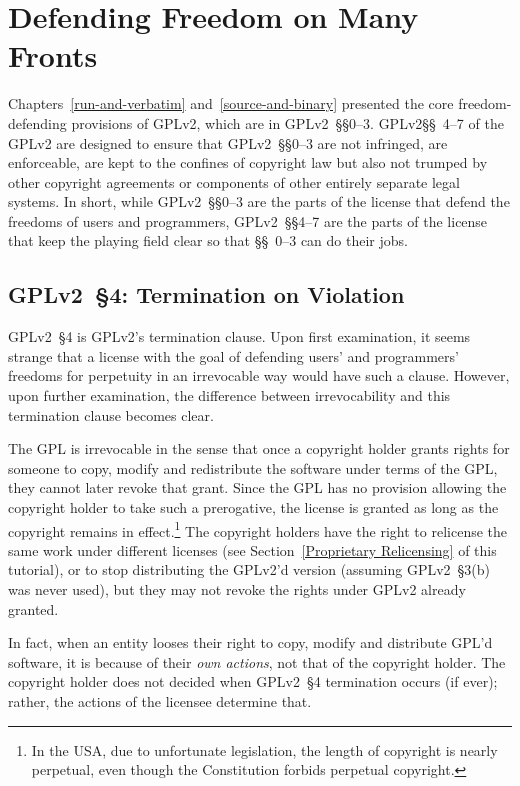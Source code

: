 \chapter{Defending Freedom on Many Fronts}

Chapters~\ref{run-and-verbatim} and~\ref{source-and-binary} presented the
core freedom-defending provisions of GPLv2\@, which are in GPLv2~\S\S0--3.
GPLv2\S\S~4--7 of the GPLv2 are designed to ensure that GPLv2~\S\S0--3 are
not infringed, are enforceable, are kept to the confines of copyright law but
also  not trumped by other copyright agreements or components of other
entirely separate legal systems.  In short, while GPLv2~\S\S0--3 are the parts
of the license that defend the freedoms of users and programmers,
GPLv2~\S\S4--7 are the parts of the license that keep the playing field clear
so that \S\S~0--3 can do their jobs.

\section{GPLv2~\S4: Termination on Violation}
\label{GPLv2s4}

GPLv2~\S4 is GPLv2's termination clause.  Upon first examination, it seems
strange that a license with the goal of defending users' and programmers'
freedoms for perpetuity in an irrevocable way would have such a clause.
However, upon further examination, the difference between irrevocability
and this termination clause becomes clear.

The GPL is irrevocable in the sense that once a copyright holder grants
rights for someone to copy, modify and redistribute the software under terms
of the GPL, they cannot later revoke that grant.  Since the GPL has no
provision allowing the copyright holder to take such a prerogative, the
license is granted as long as the copyright remains in effect.\footnote{In
  the USA, due to unfortunate legislation, the length of copyright is nearly
  perpetual, even though the Constitution forbids perpetual copyright.} The
copyright holders have the right to relicense the same work under different
licenses (see Section~\ref{Proprietary Relicensing} of this tutorial), or to
stop distributing the GPLv2'd version (assuming GPLv2~\S3(b) was never used),
but they may not revoke the rights under GPLv2 already granted.

In fact, when an entity looses their right to copy, modify and distribute
GPL'd software, it is because of their \emph{own actions}, not that of the
copyright holder.  The copyright holder does not decided when GPLv2~\S4
termination occurs (if ever); rather, the actions of the licensee determine
that.

